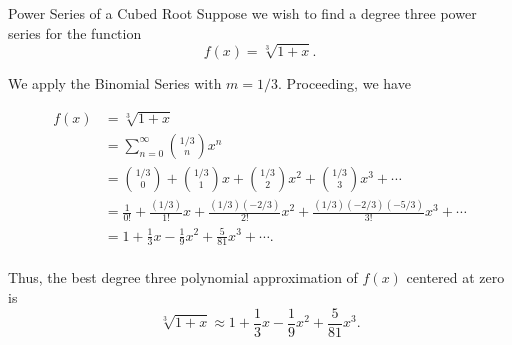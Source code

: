 \begin{example}{Power Series of a Cubed Root}
Suppose we wish to find a degree three power series for the function $$f(x)=\sqrt[3]{1+x}. $$

We apply the Binomial Series with $m=1/3$. Proceeding, we have

\begin{align*}
f(x)&=\sqrt[3]{1+x}\\
&=\sum_{n=0}^\infty\binom{1/3}{n}x^n\\
&=\binom{1/3}{0}+\binom{1/3}{1}x+\binom{1/3}{2}x^2+\binom{1/3}{3}x^3+\cdots \\
&=\frac{1}{0!}+\frac{\left(1/3\right)}{1!}x+\frac{\left(1/3\right)\left(-2/3\right)}{2!}x^2+\frac{\left(1/3\right)\left(-2/3\right)\left(-5/3\right)}{3!}x^3+\cdots \\
&=1+\frac{1}{3}x-\frac{1}{9}x^2+\frac{5}{81}x^3+\cdots. \\
\end{align*}

Thus, the best degree three polynomial approximation of $f(x)$ centered at zero is $$ \sqrt[3]{1+x}\approx 1+\frac{1}{3}x-\frac{1}{9}x^2+\frac{5}{81}x^3.$$
\end{example}